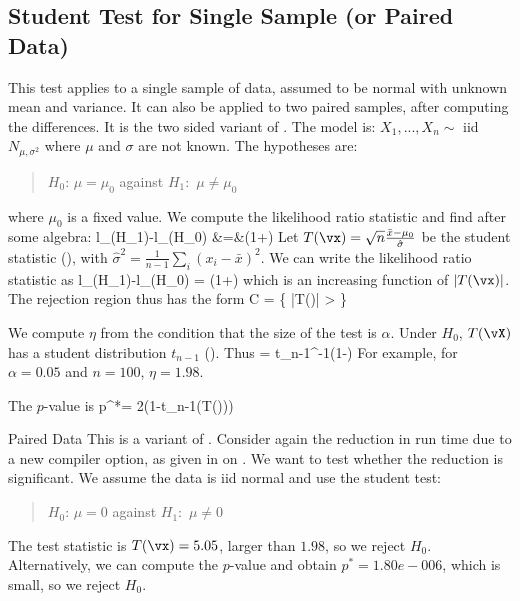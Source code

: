\subsection{Student Test for Single Sample (or Paired Data)}
This test applies to a single sample of data, assumed to be
normal with unknown mean and variance. It can also be applied
to two paired samples, after computing the differences. It is
the two sided variant of . The model is:
$X_1, ..., X_n \sim$ iid $N_{\mu, \sigma^2}$ where $\mu$ and
$\sigma$ are not known. The hypotheses are:
\begin{quote}
$H_0$: $\mu=\mu_0$ against $H_1$:~$\mu\neq \mu_0$ \end{quote}
where $\mu_0$ is a fixed value. We compute the likelihood ratio
statistic and find after some algebra:
 \bearn%
l_{\vx}(H_1)-l_{\vx}(H_0)%
&=&\ln\left(1+\right)
 \eearn
 Let $T({\vx})=\sqrt{n}\frac{\bar{x}-\mu_0}{\hat{\sigma}}$ be the student statistic
 (),
 with $\hat{\sigma}^2=\frac{1}{n-1}\sum_i(x_i-\bar{x})^2$. We can
 write the likelihood ratio statistic as
 \be
l_{\vx}(H_1)-l_{\vx}(H_0) =
\ln\left(1+\right)
 \ee
 which is an increasing function of $|T({\vx})|$. The rejection region thus has the form
\ben
 C = \left\{
\left|{T({\vx})}\right| > \eta
 \right\}
\een

We compute $\eta$ from the condition that the size of the test
is $\alpha$. Under $H_0$, $T({\vX})$ has a student distribution
$t_{n-1}$ (). Thus
 \be \eta= t_{n-1}^{-1}\left(1-\right)
 \ee
 For example, for $\alpha=0.05$ and $n=100$, $\eta=1.98$.

 The $p$-value is
 \be
 p^*= 2(1-t_{n-1}(T({\vx})))
 \ee

\begin{ex}{Paired Data} This is a variant of . Consider again
the reduction in run time due to a new compiler option, as given
in  on . We want to test
whether the reduction is significant. We assume the data is iid
normal and use the student test:
\begin{quote}
$H_0$: $\mu=0$ against $H_1$:~$\mu\neq 0$ \end{quote} The test
statistic is $T({\vx})=5.05$, larger than $1.98$, so we reject
$H_0$. Alternatively, we can compute the $p$-value and obtain
$p^*= 1.80e-006$, which is small, so we reject $H_0$.
\end{ex}

